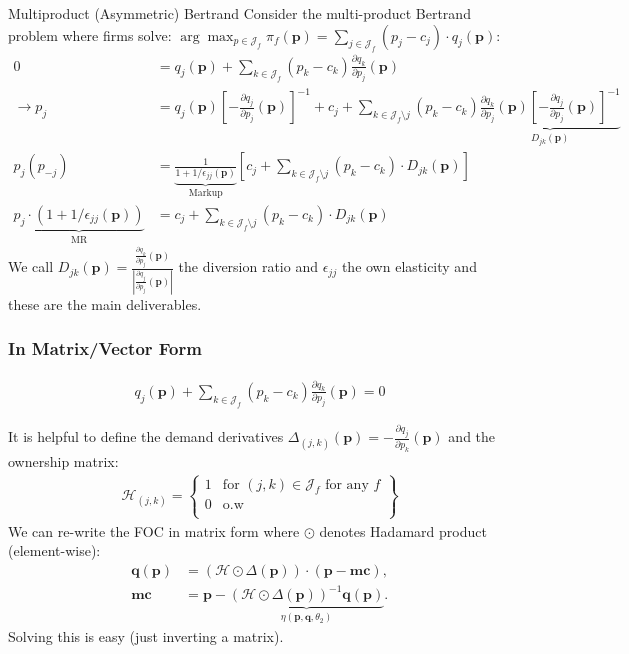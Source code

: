 \begin{frame}{Multiproduct (Asymmetric) Bertrand}
\small
Consider the multi-product Bertrand problem where firms solve: $\arg \max_{p \in \mathcal{J}_f} \pi_f (\mathbf{p}) = \sum_{j \in \mathcal{J}_f} (p_j - c_j) \cdot q_j(\mathbf{p})$:
\begin{align*}
 0&= q_j(\mathbf{p}) + \sum_{k \in \mathcal{J}_f} (p_k - c_k) \frac{\partial q_{k}}{\partial p_j}(\mathbf{p}) \\
\rightarrow p_j &=q_{j}(\mathbf{p}) \left[-\frac{\partial q_{j}}{\partial p_{j}}(\mathbf{p})\right]^{-1} + c_{j} + \sum_{k \in \mathcal{J}_{f} \setminus j} \left(p_{k}-c_{k}\right) \underbrace{\frac{\partial q_{k}}{\partial p_{j}}(\mathbf{p})\left[-\frac{\partial q_{j}}{\partial p_{j}}(\mathbf{p})\right]^{-1}}_{D_{jk}(\mathbf{p})}\\
p_j(p_{-j}) &= \underbrace{\frac{1}{1+1/\epsilon_{jj}(\mathbf{p})}}_{\text{Markup}} \left[ c_j + \sum_{k \in \mathcal{J}_{f} \setminus j}  (p_k-c_k) \cdot  D_{jk} (\mathbf{p}) \right]\\
\underbrace{p_j\cdot\left(1+1/\epsilon_{jj}(\mathbf{p})\right)}_{\text{MR}} &=  c_j + \sum_{k \in \mathcal{J}_{f} \setminus j}  (p_k-c_k) \cdot  D_{jk} (\mathbf{p})
\end{align*}
We call $D_{jk}(\mathbf{p}) = \frac{\frac{\partial q_{k}}{\partial p_j}(\mathbf{p})}{\left| \frac{\partial q_{j}}{\partial p_j}(\mathbf{p}) \right|}$ the \alert{diversion ratio} and $\epsilon_{jj}$ the \alert{own elasticity} and these are the main deliverables.
\end{frame}




\begin{frame}[plain]
\frametitle{In Matrix/Vector Form}
\begin{align*}
q_j(\mathbf{p}) + \sum_{k \in \mathcal{J}_f} (p_k - c_k) \frac{\partial q_{k}}{\partial p_j}(\mathbf{p}) =0
\end{align*}

It is helpful to define the \alert{demand derivatives} $\Delta_{(j,k)}(\mathbf{p})  = - \frac{\partial q_{j}}{\partial p_k}(\mathbf{p})$ and the \alert{ownership matrix}:
\begin{align*}
\mathcal{H}_{(j,k)} = \left\{\begin{array}{lr}
          1 & \text{for }  (j,k) \in \mathcal{J}_f \text{ for any } f \\ 
      0 & \text{o.w}\\
        \end{array} \right\}
\end{align*}
We can re-write the FOC in matrix form where $\odot$ denotes Hadamard product (element-wise):
\begin{align*}
        \mathbf{q}(\mathbf{p}) &= (\mathcal{H} \odot \Delta(\mathbf{p})) \cdot (\mathbf{p} - \mathbf{mc}), \\
       \mathbf{mc} &=  \mathbf{p} - \underbrace{(\mathcal{H} \odot \Delta(\mathbf{p}))^{-1} \mathbf{q}(\mathbf{p})}_{\eta(\mathbf{p},\mathbf{q},\theta_2)}.
\end{align*}
Solving this is easy (just inverting a matrix).
\end{frame}


